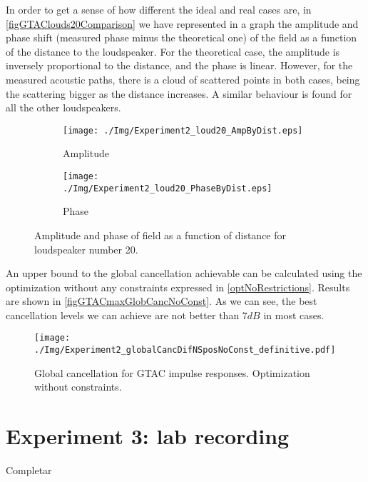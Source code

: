 In order to get a sense of how different the ideal and real cases are, in \autoref{figGTAClouds20Comparison} we have represented in a graph the amplitude and phase shift (measured phase minus the theoretical one) of the field as a function of the distance to the loudspeaker. For the theoretical case, the amplitude is inversely proportional to the distance, and the phase is linear. However, for the measured acoustic paths, there is a cloud of scattered points in both cases, being the scattering bigger as the distance increases. A similar behaviour is found for all the other loudspeakers.

\begin{figure}[H]
	\begin{subfigure}[b]{0.49\textwidth}
		\centering
		\texttt{[image: ./Img/Experiment2\_loud20\_AmpByDist.eps]}
		\caption{Amplitude}
	\end{subfigure}
	\begin{subfigure}[b]{0.49\textwidth}
		\centering
		\texttt{[image: ./Img/Experiment2\_loud20\_PhaseByDist.eps]}
		\caption{Phase}
	\end{subfigure}
	\caption{Amplitude and phase of field as a function of distance for loudspeaker number 20.}
	\label{figGTAClouds20Comparison}
\end{figure}

An upper bound to the global cancellation achievable can be calculated using the optimization without any constraints expressed in \autoref{optNoRestrictions}. Results are shown in \autoref{figGTACmaxGlobCancNoConst}. As we can see, the best cancellation levels we can achieve are not better than $7\si{dB}$ in most cases.

\begin{figure}[H]
	\centering
	\texttt{[image: ./Img/Experiment2\_globalCancDifNSposNoConst\_definitive.pdf]}
	\caption{Global cancellation for GTAC impulse responses. Optimization without constraints.}
	\label{figGTACmaxGlobCancNoConst}
\end{figure}

\section{Experiment 3: lab recording}
Completar
